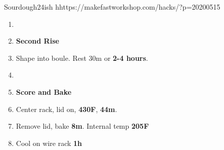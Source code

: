 \documentclass[]{mikescards}
\begin{document}
\begin{recipe}{Sourdough}{24ish h}{https://makefastworkshop.com/hacks/?p=20200515}
\begin{parcolumns}[colwidths={1=70pt}, rulebetween]{2}
{\begin{enumerate}
      \item 
      \item \textbf{Second Rise}
      \item Shape into boule. Rest 30m or \textbf{2-4 hours}.
      \item 
      \item \textbf{Score and Bake}
      \item Center rack, lid on, \textbf{430\textdegree F}, \textbf{44m}.
      \item Remove lid, bake \textbf{8m}. Internal temp \textbf{205\textdegree F}
      \item Cool on wire rack \textbf{1h}
    \end{enumerate}
  }
\end{parcolumns}
\end{recipe}
\end{document}
